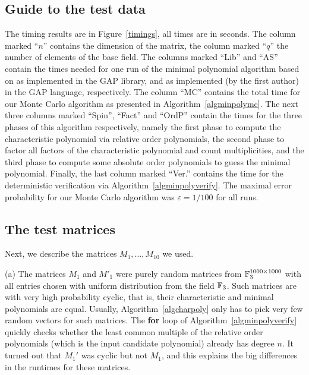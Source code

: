\subsection{Guide to the test data}
The timing results
are in Figure~\ref{timings}, all times are in seconds. 
The column marked ``$n$'' contains the
dimension of the matrix, the column marked ``$q$'' the number of elements
of the base field. 
The columns marked ``Lib'' and ``AS'' contain the times needed for one run of 
the minimal polynomial algorithm based on \cite{Steel} as implemented in 
the {\sf GAP} library, and as implemented (by the first author) in the
{\sf GAP} language, respectively.
The column ``MC'' contains the total time for our 
Monte Carlo algorithm as presented in Algorithm~\ref{algminpolymc}.
The next three columns marked ``Spin'', ``Fact'' and ``OrdP''
contain the times for the three phases of this algorithm respectively, 
namely the first phase to compute the characteristic polynomial via
relative order polynomials, the second phase to factor all factors of
the characteristic polynomial and count multiplicities, and the third
phase to compute some absolute order polynomials to guess the minimal
polynomial. Finally, the last column marked ``Ver.'' contains
the time for the deterministic verification via 
%
Algorithm~\ref{algminpolyverify}.
The maximal error probability for our Monte Carlo algorithm was
$\varepsilon = 1/100$ for all runs.


\subsection{The test matrices}
Next, we describe the matrices $M_1, \ldots, M_{10}$ we used.

\enlargethispage{1\baselineskip}
(a) \quad The matrices $M_1$ and $M'_1$ were purely random matrices from
$\mathbb{F}_3^{1000\times 1000}$ with all entries
chosen with uniform distribution from the field $\mathbb{F}_3$. Such matrices
are with very high probability cyclic, that is, their characteristic and
minimal polynomials are equal. Usually, Algorithm~\ref{algcharpoly} only
has to pick very few random vectors for such matrices. The {\bf for} loop
of Algorithm~\ref{algminpolyverify} quickly checks whether the least common multiple
of the relative order polynomials (which is the input candidate polynomial)
already has degree $n$. It turned out that $M_1'$ was cyclic but not $M_1$, 
and this explains the
big differences in the runtimes for these matrices.

